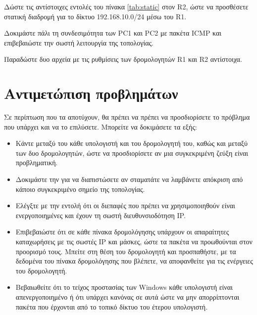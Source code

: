 \documentclass{EdipyLabs} %
\begin{document}
\begin{givecommandbox}
	Δώστε τις αντίστοιχες εντολές του πίνακα \ref{tab:static} στον R2, ώστε να προσθέσετε στατική διαδρομή για το δίκτυο 192.168.10.0/24 μέσω του R1.
\end{givecommandbox}

Δοκιμάστε πάλι τη συνδεσιμότητα των PC1 και PC2 με πακέτα ICMP και επιβεβαιώστε την σωστή λειτουργία της τοπολογίας.

\begin{assignmentbox}
	Παραδώστε δυο αρχεία με τις ρυθμίσεις των δρομολογητών R1 και R2 αντίστοιχα.
\end{assignmentbox}

\section{Αντιμετώπιση προβλημάτων}
Σε περίπτωση που τα  αποτύχουν, θα πρέπει να πρέπει να προσδιορίσετε το πρόβλημα που υπάρχει και να το επιλύσετε. Μπορείτε να δοκιμάσετε τα εξής:
\begin{itemize}	
	\item Κάντε  μεταξύ του κάθε υπολογιστή και του δρομολογητή του, καθώς και μεταξύ των δυο δρομολογητών, ώστε να προσδιορίσετε αν μια συγκεκριμένη ζεύξη είναι προβληματική.
	
	\item Δοκιμάστε την  για να διαπιστώσετε αν σταματάτε να λαμβάνετε απόκριση από κάποιο συγκεκριμένο σημείο της τοπολογίας.
	
	\item Ελέγξτε με την εντολή  ότι οι διεπαφές που πρέπει να χρησιμοποιηθούν είναι ενεργοποιημένες και έχουν τη σωστή διευθυνσιοδότηση IP. 
	
	\item Επιβεβαιώστε ότι σε κάθε πίνακα δρομολόγησης υπάρχουν οι απαραίτητες καταχωρήσεις με τις σωστές IP και μάσκες, ώστε τα πακέτα να προωθούνται στον προορισμό τους. Μπείτε στη θέση του δρομολογητή και προσπαθήστε, με τα δεδομένα του πίνακα δρομολόγησης που βλέπετε, να αποφανθείτε για τις ενέργειες του δρομολογητή. 
	
	\item Βεβαιωθείτε ότι το τείχος προστασίας των Windows κάθε υπολογιστή είναι απενεργοποιημένο ή ότι υπάρχει κανόνας σε αυτά ώστε να μην απορρίπτονται πακέτα που έρχονται από το τοπικό δίκτυο του έτερου υπολογιστή. 
\end{itemize}
\end{document}
